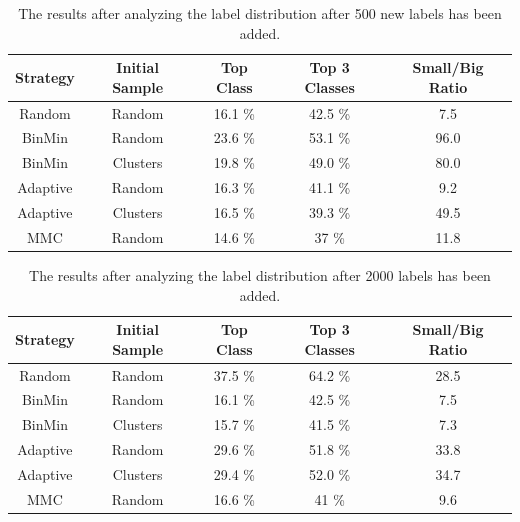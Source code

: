 \begin{table}[h!]
    \centering
    \begin{tabular}{|ccccc|}
        \hline
        \textbf{Strategy} & \textbf{Initial Sample} & \textbf{Top Class} & \textbf{Top 3 Classes} & \textbf{Small/Big Ratio}\\
        \hline
        Random & Random &  16.1 \% & 42.5 \% & 7.5 \\
        BinMin & Random &  23.6 \% & 53.1 \% & 96.0 \\
        BinMin & Clusters & 19.8 \% & 49.0 \% & 80.0 \\
        Adaptive & Random & 16.3 \% & 41.1 \% & 9.2 \\
        Adaptive & Clusters & 16.5 \% & 39.3 \% & 49.5 \\
        MMC & Random & 14.6 \% & 37 \% & 11.8 \\
        \hline
    \end{tabular}
    \caption{The results after analyzing the label distribution after 500 new labels has been added.}
    \label{tab:distribution-result-500}
\end{table}

\begin{table}[h!]
    \centering
    \begin{tabular}{|ccccc|}
        \hline
        \textbf{Strategy} & \textbf{Initial Sample} & \textbf{Top Class} & \textbf{Top 3 Classes} & \textbf{Small/Big Ratio}\\
        \hline
        Random & Random & 37.5 \% & 64.2 \% & 28.5 \\
        BinMin & Random & 16.1 \% & 42.5 \% & 7.5 \\
        BinMin & Clusters & 15.7 \% & 41.5 \% & 7.3 \\
        Adaptive & Random & 29.6 \% & 51.8 \% & 33.8 \\
        Adaptive & Clusters & 29.4 \% & 52.0 \% & 34.7 \\
        MMC & Random & 16.6 \% & 41 \% & 9.6 \\
        \hline
    \end{tabular}
    \caption{The results after analyzing the label distribution after 2000 labels has been added.}
    \label{tab:distribution-result-2000}
\end{table}